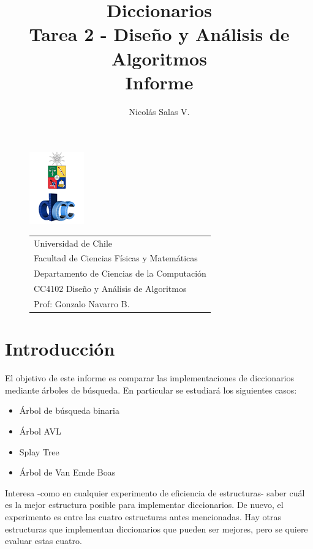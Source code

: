 \documentclass[12pt,letterpaper]{report}
\title{\Huge Diccionarios \\ Tarea 2 - Diseño y Análisis de Algoritmos \\ Informe}
\author{Nicolás Salas V.}
\begin{document}
\begin{figure}[t]
\includegraphics[scale=0.83]{logo.png}
\begin{tabular}{l}
\small Universidad de Chile\\
\small Facultad de Ciencias Físicas y Matemáticas\\
\small Departamento de Ciencias de la Computación\\
\small CC4102 Diseño y Análisis de Algoritmos\\
\small Prof: Gonzalo Navarro B.
\vspace{2.3cm}
\end{tabular}
\end{figure}

\maketitle

\tableofcontents
\newpage

\section{Introducción}
El objetivo de este informe es comparar las implementaciones de diccionarios mediante \'arboles de b\'usqueda. En particular se estudiar\'a los siguientes casos:

\begin{itemize}
\item \'Arbol de b\'usqueda binaria
\item \'Arbol AVL
\item Splay Tree
\item \'Arbol de Van Emde Boas
\end{itemize}

Interesa -como en cualquier experimento de eficiencia de estructuras- saber cu\'al es la mejor estructura posible para implementar diccionarios. De nuevo, el experimento es entre las cuatro estructuras antes mencionadas. Hay otras estructuras que implementan diccionarios que pueden ser mejores, pero se quiere evaluar estas cuatro.\\
\end{document}
